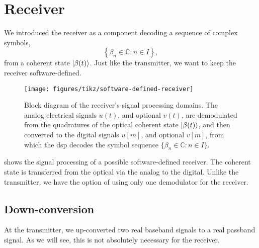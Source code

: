 \section{Receiver}
\FloatBarrier

We introduced the receiver as a component decoding a sequence of complex symbols,
\begin{equation}
	\left\{
		\beta_n
		\in
		\mathbb{C}
		\colon
		n\in I
	\right\}
	,
\end{equation}
from a coherent state $\lvert\beta(t)\rangle$.
Just like the transmitter, we want to keep the receiver software-defined.
\begin{figure}[htb]
	\centering
	\texttt{[image: figures/tikz/software-defined-receiver]}
	\caption{Block diagram of the receiver's signal processing domains. The analog electrical signals $u(t)$, and optional $v(t)$, are demodulated from the quadratures of the optical coherent state $\lvert\beta(t)\rangle$, and then converted to the digital signals $u[m]$, and optional $v[m]$, from which the \gls{dsp} decodes the symbol sequence $\{\beta_n\in\mathbb{C}\colon n\in I\}$.}\label{fig:software_defined_receiver}
\end{figure}
 shows the signal processing of a possible software-defined receiver.
The coherent state is transferred from the optical via the analog to the digital.
Unlike the transmitter, we have the option of using only one demodulator for the receiver.

\FloatBarrier
\subsection{Down-conversion}

At the transmitter, we up-converted two real baseband signals to a real passband signal.
As we will see, this is not absolutely necessary for the receiver.

